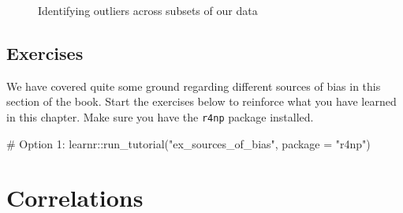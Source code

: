 \documentclass[
  letterpaper,
]{krantz}
\makeatletter
\newenvironment{Shaded}{\begin{snugshade}}{\end{snugshade}}
\newcommand{\AttributeTok}[1]{\textcolor[rgb]{0.40,0.45,0.13}{#1}}
\newcommand{\CommentTok}[1]{\textcolor[rgb]{0.37,0.37,0.37}{#1}}
\newcommand{\FunctionTok}[1]{\textcolor[rgb]{0.28,0.35,0.67}{#1}}
\newcommand{\NormalTok}[1]{\textcolor[rgb]{0.00,0.23,0.31}{#1}}
\newcommand{\SpecialCharTok}[1]{\textcolor[rgb]{0.37,0.37,0.37}{#1}}
\newcommand{\StringTok}[1]{\textcolor[rgb]{0.13,0.47,0.30}{#1}}
\newenvironment{kframe}{%
\medskip{}
\setlength{\fboxsep}{.8em}
 \def\at@end@of@kframe{}%
 \ifinner\ifhmode%
  \def\at@end@of@kframe{\end{minipage}}%
  \begin{minipage}{\columnwidth}%
 \fi\fi%
 \def\FrameCommand##1{\hskip\@totalleftmargin \hskip-\fboxsep
 \colorbox{shadecolor}{##1}\hskip-\fboxsep
     \hskip-\linewidth \hskip-\@totalleftmargin \hskip\columnwidth}%
 \MakeFramed {\advance\hsize-\width
   \@totalleftmargin\z@ \linewidth\hsize
   \@setminipage}}%
 {\par\unskip\endMakeFramed%
 \at@end@of@kframe}
\renewenvironment{Shaded}{\begin{kframe}}{\end{kframe}}
\makeatother
\begin{document}
\begin{figure}


\caption{\label{fig-final-plot-outliers}Identifying outliers across
subsets of our data}

\end{figure}%

\section{Exercises}\label{sec-exercises-sources-of-bias}

We have covered quite some ground regarding different sources of bias in
this section of the book. Start the exercises below to reinforce what
you have learned in this chapter. Make sure you have the \texttt{r4np}
package installed.

\begin{Shaded}
\begin{Highlighting}[]
\CommentTok{\# Option 1:}
\NormalTok{learnr}\SpecialCharTok{::}\FunctionTok{run\_tutorial}\NormalTok{(}\StringTok{"ex\_sources\_of\_bias"}\NormalTok{, }\AttributeTok{package =} \StringTok{"r4np"}\NormalTok{)}
\end{Highlighting}
\end{Shaded}


\chapter{Correlations}\label{sec-correlations}
\end{document}
